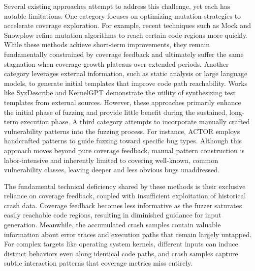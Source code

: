 Several existing approaches attempt to address this challenge, yet each has notable limitations. One category focuses on optimizing mutation strategies to accelerate coverage exploration. For example, recent techniques such as Mock and Snowplow refine mutation algorithms to reach certain code regions more quickly. While these methods achieve short-term improvements, they remain fundamentally constrained by coverage feedback and ultimately suffer the same stagnation when coverage growth plateaus over extended periods. Another category leverages external information, such as static analysis or large language models, to generate initial templates that improve code path reachability. Works like SyzDescribe and KernelGPT demonstrate the utility of synthesizing test templates from external sources. However, these approaches primarily enhance the initial phase of fuzzing and provide little benefit during the sustained, long-term execution phase. A third category attempts to incorporate manually crafted vulnerability patterns into the fuzzing process. For instance, ACTOR employs handcrafted patterns to guide fuzzing toward specific bug types. Although this approach moves beyond pure coverage feedback, manual pattern construction is labor-intensive and inherently limited to covering well-known, common vulnerability classes, leaving deeper and less obvious bugs unaddressed.

The fundamental technical deficiency shared by these methods is their exclusive reliance on coverage feedback, coupled with insufficient exploitation of historical crash data. Coverage feedback becomes less informative as the fuzzer saturates easily reachable code regions, resulting in diminished guidance for input generation. Meanwhile, the accumulated crash samples contain valuable information about error traces and execution paths that remain largely untapped. For complex targets like operating system kernels, different inputs can induce distinct behaviors even along identical code paths, and crash samples capture subtle interaction patterns that coverage metrics miss entirely.

